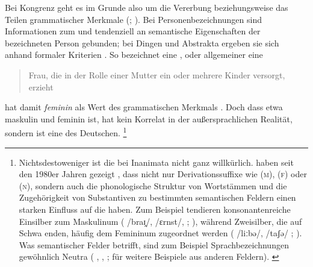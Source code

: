 Bei Kongrenz geht es im Grunde also um die Vererbung beziehungsweise das Teilen
grammatischer Merkmale (;
\cite{corbett2012}). Bei Personenbezeichnungen sind Informationen zum
 und  tendenziell an semantische Eigenschaften der
bezeichneten Person gebunden; bei Dingen und Abstrakta ergeben
sie sich anhand formaler Kriterien \autocites[vgl.][2--4,
125--132]{corbett2006}{koepckezubin2017}. So bezeichnet
 eine ,
oder allgemeiner eine \blockcquote[s.\,v.~]{duden-online}{Frau, die
in der Rolle einer Mutter ein oder mehrere Kinder versorgt, erzieht}.
 hat damit \emph{feminin} als Wert des grammatischen
Merkmals \emph{}. Doch dass etwa 
maskulin und  feminin ist, hat kein Korrelat in der außersprachlichen
Realität, sondern ist eine  des Deutschen.%
%
	\footnote{Nichtsdestoweniger ist die  bei
		Inanimata nicht ganz willkürlich.
		\citeauthor{koepckezubin2017} haben seit den 1980er Jahren gezeigt
		\autocites[z.\,B.][]%
			{koepcke1982}%
			{koepckezubin1996}%
			{koepckezubin2009}%
			{koepckezubin2017},
		dass nicht nur Derivationssuffixe wie
			 (\textsc{m}),
			 (\textsc{f}) oder
			 (\textsc{n}),
		sondern auch die phonologische Struktur von Wortstämmen und die
		Zugehörigkeit von Substantiven zu bestimmten
		semantischen Feldern einen starken Einfluss auf die
		 haben. Zum Beispiel tendieren konsonantenreiche
		Einsilber zum Maskulinum (%
			 /braɪ̯/,
			/ɛrnst/,
			;
		\cite[vgl.][475--479]{koepckezubin1996}), während Zweisilber, die auf
		Schwa enden, häufig dem Femininum zugeordnet werden (%
			 /liːbə/,
			/taʃə/%
			;
		\cite[vgl.][207--209]{koepckezubin2017}). Was semantischer Felder
		betrifft, sind zum Beispiel Sprachbezeichnungen gewöhnlich Neutra (%
			,
			,
			;
		\cites[siehe]%
			[480]{koepckezubin1996}%
			[137--139]{koepckezubin2009}%
			[210--214]{koepckezubin2017}
		für weitere Beispiele aus anderen Feldern).%
		\label{fn:koepckezubin}
	}

